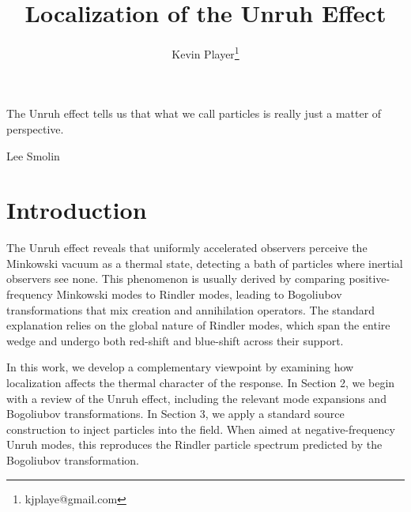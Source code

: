 \documentclass[12pt,a4paper]{article}
\begin{document}
\title{Localization of the Unruh Effect}
\author[1]{Kevin Player\footnote{kjplaye@gmail.com}}

\maketitle

\epigraph{The Unruh effect tells us that what we call particles is really just a matter of perspective.}{Lee Smolin}



\section{Introduction}

The Unruh effect reveals that uniformly accelerated observers perceive the Minkowski vacuum as a thermal state, detecting a bath of particles where inertial observers see none. This phenomenon is usually derived by comparing positive-frequency Minkowski modes to Rindler modes, leading to Bogoliubov transformations that mix creation and annihilation operators. The standard explanation relies on the global nature of Rindler modes, which span the entire wedge and undergo both red-shift and blue-shift across their support.

In this work, we develop a complementary viewpoint by examining how localization affects the thermal character of the response. In Section 2, we begin with a review of the Unruh effect, including the relevant mode expansions and Bogoliubov transformations. In Section 3, we apply a standard source construction to inject particles into the field. When aimed at negative-frequency Unruh modes, this reproduces the Rindler particle spectrum predicted by the Bogoliubov transformation.
\end{document}
